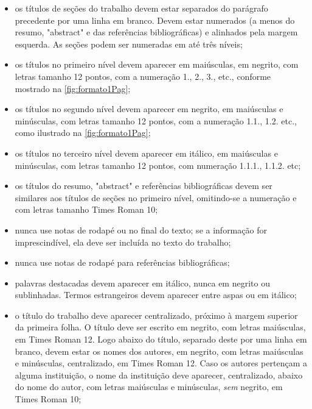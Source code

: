 \documentclass{anpet}
\begin{document}
\begin{itemize}
\item os títulos de seções do trabalho devem estar separados do parágrafo precedente por uma linha em branco. Devem estar numerados (a menos do resumo, "abstract" e das referências bibliográficas) e alinhados pela margem esquerda. As seções podem ser numeradas em até
três níveis;

\item os títulos no primeiro nível devem aparecer em maiúsculas, em negrito, com letras tamanho 12 pontos, com a numeração 1., 2., 3., etc., conforme mostrado na \autoref{fig:formato1Pag};

\item os títulos no segundo nível devem aparecer em negrito, em maiúsculas e minúsculas, com letras tamanho 12 pontos, com a numeração 1.1., 1.2. etc., como ilustrado na \autoref{fig:formato1Pag};

\item os títulos no terceiro nível devem aparecer em itálico, em maiúsculas e minúsculas, com letras tamanho 12 pontos, com numeração 1.1.1., 1.1.2. etc;

\item os títulos do resumo, "abstract" e referências bibliográficas devem ser similares aos títulos de seções no primeiro nível, omitindo-se a numeração e com letras tamanho Times Roman 10;

\item nunca use notas de rodapé ou no final do texto; se a informação for imprescindível, ela deve ser incluída no texto do trabalho;

\item nunca use notas de rodapé para referências bibliográficas;

\item palavras destacadas devem aparecer em itálico, nunca em negrito ou sublinhadas. Termos estrangeiros devem aparecer entre aspas ou em itálico;

\item o título do trabalho deve aparecer centralizado, próximo à margem superior da primeira folha. O título deve ser escrito em negrito, com letras maiúsculas, em Times Roman 12. Logo abaixo do título, separado deste por uma linha em branco, devem estar os nomes dos autores, em negrito, com letras maiúsculas e minúsculas, centralizado, em Times Roman 12. Caso os autores pertençam a alguma instituição, o nome da instituição deve aparecer, centralizado, abaixo do nome do autor, com letras maiúsculas e minúsculas, \textit{sem} negrito, em Times Roman 10;


\end{itemize}
\end{document}
